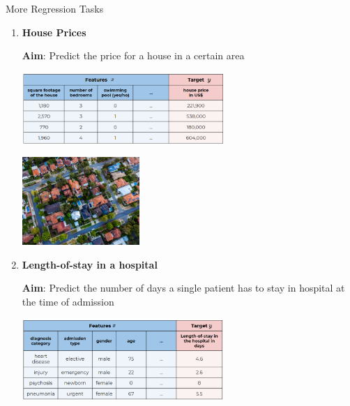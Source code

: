 \documentclass[11pt,compress,t,notes=noshow, xcolor=table]{beamer}
\begin{document}

\begin{vbframe}{More Regression Tasks}

\begin{enumerate}

  \item \textbf{House Prices}
  
  \medskip
  
    \textbf{Aim}: Predict the price for a house in a certain area
    
    \lz
    
    \begin{center}
    \includegraphics[width=0.6\textwidth]{figure_man/ml-basics-supervised-task-houses-data.png} 
    
    \lz
    
    \includegraphics[width=0.35\textwidth]{figure_man/ml-basics-supervised-task-houses-pic.jpg} 
    
    \end{center}
    
  \framebreak
  
  \item \textbf{Length-of-stay in a hospital}
  
  \textbf{Aim}: Predict the number of days a single patient has to stay 
    in hospital at the time of admission
   
    
    \lz
    
    \begin{center}
    \includegraphics[width=0.6\textwidth]{figure_man/ml-basics-supervised-task-hosp-data.png} 
    

\end{center}
\end{enumerate}
\end{vbframe}
\end{document}
